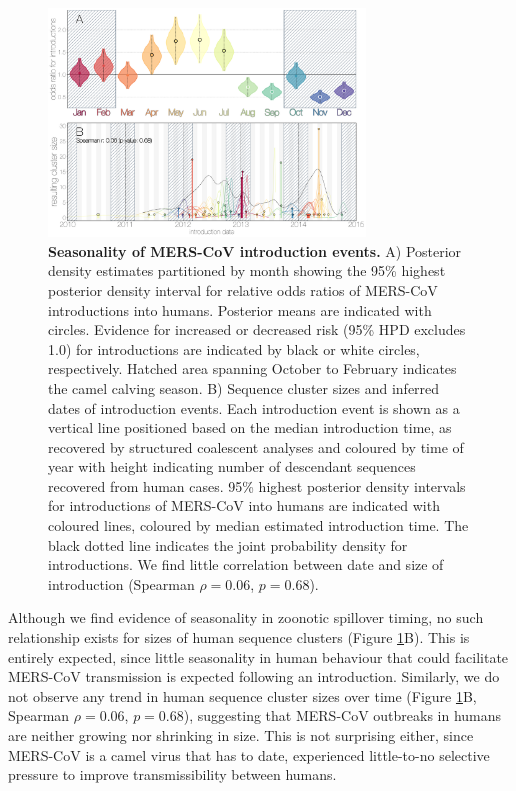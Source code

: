 \documentclass[11pt,oneside,letterpaper]{article}
\begin{document}
\begin{figure}[h]
\centering
	\includegraphics[width=0.75\textwidth]{figures/mers_seasonality.png}
	\caption{\textbf{Seasonality of MERS-CoV introduction events.}
A) Posterior density estimates partitioned by month showing the 95\% highest posterior density interval for relative odds ratios of MERS-CoV introductions into humans.
Posterior means are indicated with circles.
Evidence for increased or decreased risk (95\% HPD excludes 1.0) for introductions are indicated by black or white circles, respectively.
Hatched area spanning October to February indicates the camel calving season.
B) Sequence cluster sizes and inferred dates of introduction events.
Each introduction event is shown as a vertical line positioned based on the median introduction time, as recovered by structured coalescent analyses and coloured by time of year with height indicating number of descendant sequences recovered from human cases.
95\% highest posterior density intervals for introductions of MERS-CoV into humans are indicated with coloured lines, coloured by median estimated introduction time.
The black dotted line indicates the joint probability density for introductions.
We find little correlation between date and size of introduction (Spearman $\rho = 0.06$, $p=0.68$).
	}
	\label{seasonality}
\end{figure}

Although we find evidence of seasonality in zoonotic spillover timing, no such relationship exists for sizes of human sequence clusters (Figure \ref{seasonality}B).
This is entirely expected, since little seasonality in human behaviour that could facilitate MERS-CoV transmission is expected following an introduction.
Similarly, we do not observe any trend in human sequence cluster sizes over time (Figure \ref{seasonality}B, Spearman $\rho = 0.06$, $p=0.68$), suggesting that MERS-CoV outbreaks in humans are neither growing nor shrinking in size.
This is not surprising either, since MERS-CoV is a camel virus that has to date, experienced little-to-no selective pressure to improve transmissibility between humans.
\end{document}
